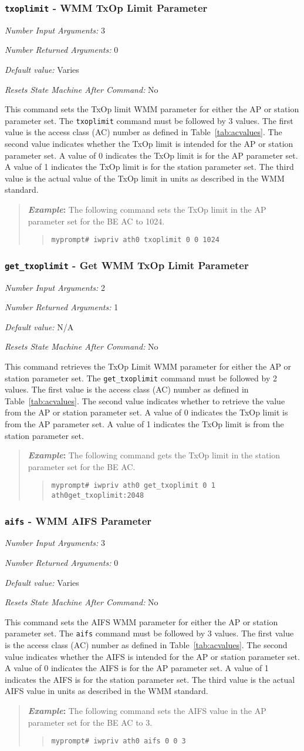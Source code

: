 \documentclass[10pt,fullpage]{article}
\newcommand{\mytt}[1]{{\texttt{#1}}}
\newcommand{\bv}{\begin{verse}}
\newcommand{\ev}{\end{verse}}
\newcommand{\cmd}[1]{{\texttt{myprompt\# #1}}}
\newcommand{\argdesc}[4]{\begin{description}
\itemsep -6pt
\item \textit{Number Input Arguments:} #1
\item \textit{Number Returned Arguments:} #2
\item \textit{Default value:} #3
\item \textit{Resets State Machine After Command:} #4
\end{description}
}
\newenvironment{example}{\begin{quote}\textbf{\textit{Example}:}}{\end{quote}}
\begin{document}
\subsubsection{\mytt{txoplimit} - WMM TxOp Limit Parameter}
\argdesc{3}{0}{Varies}{No}
This command sets the TxOp limit WMM parameter for either the AP or
station parameter set.  The \mytt{txoplimit} command must be followed
by 3 values.  The first value is the access class (AC) number as
defined in Table~\ref{tab:acvalues}.  The second value indicates
whether the TxOp limit is intended for the AP or station parameter
set.  A value of 0 indicates the TxOp limit is for the AP parameter
set.  A value of 1 indicates the TxOp limit is for the station
parameter set.  The third value is the actual value of the TxOp limit
in units as described in the WMM standard.
\begin{example}
  The following command sets the TxOp limit in the AP parameter set
  for the BE AC to 1024.
  \bv
  \cmd{iwpriv ath0 txoplimit 0 0 1024}
  \ev
\end{example}

\subsubsection{\mytt{get\_txoplimit} - Get WMM TxOp Limit Parameter}
\argdesc{2}{1}{N/A}{No}
This command retrieves the TxOp Limit WMM parameter for either the AP
or station parameter set. The \mytt{get\_txoplimit} command must be
followed by 2 values.  The first value is the access class (AC) number
as defined in Table~\ref{tab:acvalues}.  The second value indicates
whether to retrieve the value from the AP or station parameter set. A
value of 0 indicates the TxOp limit is from the AP parameter set.  A
value of 1 indicates the TxOp limit is from the station parameter set.
\begin{example}
  The following command gets the TxOp limit in the station parameter
  set for the BE AC.
  \bv
  \cmd{iwpriv ath0 get\_txoplimit 0 1}\\
  \mytt{ath0\hspace{32pt}get\_txoplimit:2048}
  \ev
\end{example}

\subsubsection{\mytt{aifs} - WMM AIFS Parameter}
\argdesc{3}{0}{Varies}{No}
This command sets the AIFS WMM parameter for either the AP or station
parameter set.  The \mytt{aifs} command must be followed by 3 values.
The first value is the access class (AC) number as defined in
Table~\ref{tab:acvalues}.  The second value indicates whether the AIFS
is intended for the AP or station parameter set.  A value of 0
indicates the AIFS is for the AP parameter set.  A value of 1
indicates the AIFS is for the station parameter set.  The third value
is the actual AIFS value in units as described in the WMM standard.
\begin{example}
  The following command sets the AIFS value in the AP parameter set
  for the BE AC to 3.
  \bv
  \cmd{iwpriv ath0 aifs 0 0 3}
  \ev
\end{example}
\end{document}
